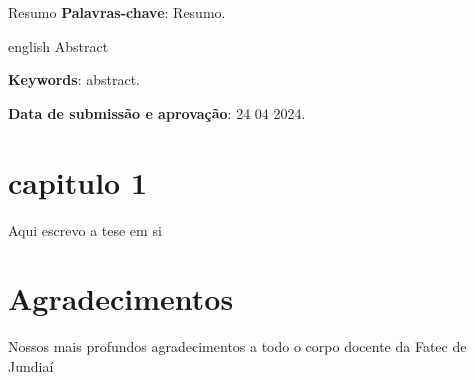\documentclass[article, 11pt, oneside, a4paper, english, brazil, sumario=tradicional]{abntex2}
\begin{document}

\frenchspacing

\maketitle
\begin{resumoumacoluna}
  Resumo
  \vspace{\onelineskip}
  \noindent
  \textbf{Palavras-chave}: Resumo.
\end{resumoumacoluna}

\renewcommand{\resumoname}{Abstract}
\begin{resumoumacoluna}
  \begin{otherlanguage*}{english}
    Abstract
    \vspace{\onelineskip}

    \noindent
    \textbf{Keywords}: abstract.
  \end{otherlanguage*}
\end{resumoumacoluna}
\begin{center}\smaller

  \textbf{Data de submissão e aprovação}: 24 04 2024.

\end{center}

\newpage

\tableofcontents*
\cleardoublepage

\textual

\section{capitulo 1}

Aqui escrevo a tese em si

\postextual


\section*{Agradecimentos}

Nossos mais profundos agradecimentos a todo o corpo docente da Fatec de Jundiaí

\newpage

\end{document}
